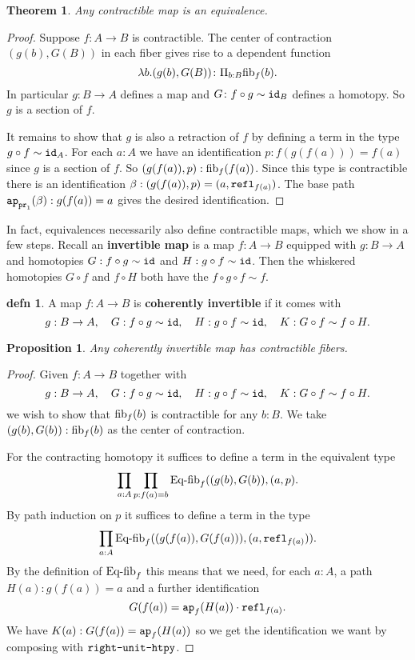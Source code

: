 \documentclass{amsart}
\theoremstyle{theorem}
\newtheorem*{thm}{Theorem}
\newtheorem*{prop}{Proposition}
\theoremstyle{definition}
\newtheorem*{defn}{defn}
\theoremstyle{remark}
\newcommand{\0}{\mathbbe{0}}
\newcommand{\1}{\mathbbe{1}}
\newcommand{\2}{\mathbbe{2}}
\newcommand{\3}{\mathbbe{3}}
\newcommand{\4}{\mathbbe{4}}
\newcommand{\term}[1]{{\textup{\texttt{#1}}}}
\newcommand{\type}[1]{{\textup{#1}}}
\newcommand{\id}{\term{id}}
\newcommand{\pr}{\term{pr}}
\newcommand{\refl}{\term{refl}}
\newcommand{\ap}{\term{ap}}
\newcommand{\fib}{\type{fib}}
\begin{document}
\begin{thm} Any contractible map is an equivalence.
\end{thm}
\begin{proof}
Suppose $f \colon A \to B$ is contractible. The center of contraction $(g(b),G(B))$ in each fiber gives rise to a dependent function
\[ \lambda b. (g(b),G(B)) \colon \Pi_{b:B} \fib_f(b).\]
In particular $g : B \to A$ defines a map and $G \colon f \circ g \sim \id_B$ defines a homotopy. So $g$ is a section of $f$.

It remains to show that $g$ is also a retraction of $f$ by defining a term in the type $g \circ f \sim \id_A$. For each $a : A$ we have an identification $p : f(g(f(a))) = f(a)$ since $g$ is a section of $f$. So $(g(f(a)),p) : \fib_f(f(a))$. Since this type is contractible there is an identification $\beta : (g(f(a)),p) = (a, \refl_{f(a)})$. The base path $\ap_{\pr_1}(\beta) : g(f(a)) = a$ gives the desired identification.
\end{proof}

In fact, equivalences necessarily also define contractible maps, which we show in a few steps. Recall an \textbf{invertible map} is a map $f \colon A \to B$ equipped with $g \colon B \to A$ and homotopies $G : f \circ g \sim \id$ and $H : g \circ f \sim \id$. Then the whiskered homotopies $G \circ f$ and $f \circ H$ both have the $f \circ g \circ f \sim f$.

\begin{defn} A map $f \colon A \to B$ is \textbf{coherently invertible} if it comes with
\[ g : B \to A, \quad G : f \circ g \sim \id, \quad H : g \circ f \sim \id, \quad K : G \circ f \sim f \circ H.\]
\end{defn}

\begin{prop} Any coherently invertible map has contractible fibers.
\end{prop}
\begin{proof}
Given $f \colon A \to B$ together with
\[ g : B \to A, \quad G : f \circ g \sim \id, \quad H : g \circ f \sim \id, \quad K : G \circ f \sim f \circ H.\]
we wish to show that $\fib_f(b)$ is contractible for any $b : B$. We take $(g(b), G(b)) : \fib_f(b)$ as the center of contraction. 

For the contracting homotopy it suffices to define a term in the equivalent type
\[ \prod_{a :A} \prod_{p : f(a) = b} \type{Eq-fib}_f((g(b),G(b)), (a,p).\]
By path induction on $p$ it suffices to define a term in the type
\[ \prod_{a :A} \type{Eq-fib}_f((g(f(a)),G(f(a))),(a, \refl_{f(a)})).\]
By the definition of $\type{Eq-fib}_f$ this means that we need, for each $a:A$, a path $H(a) : g(f(a))=a$ and a further identification
\[ G(f(a)) = \ap_f(H(a)) \cdot \refl_{f(a)}.\]
We have $K(a) : G(f(a)) = \ap_f(H(a))$ so we get the identification we want by composing with $\term{right-unit-htpy}$.\end{proof}
\end{document}
